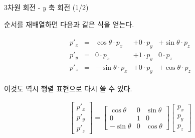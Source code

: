 \begin{frame}{3차원 회전 - $y$ 축 회전 (1/2)}

순서를 재배열하면 다음과 같은 식을 얻는다.

\begin{eqnarray}
\begin{array}{clrrr}
p'_x  & = & \cos \theta \cdot p_x &+ 0 \cdot p_y &+ \sin \theta \cdot p_z  \\
p'_y  & =  &0 \cdot p_x &+ 1 \cdot p_y & 0 \cdot p_z \\
p'_z  & = &-\sin \theta \cdot p_x &+ 0 \cdot p_y  & + \cos \theta \cdot p_z 
\end{array} \nonumber
\end{eqnarray}

이것도 역시 행렬 표현으로 다시 쓸 수 있다.

\begin{eqnarray}
\left [ \begin{array}{c} p'_x \\ p'_y \\ p'_z  \end{array} \right ] 
=
\left [ \begin{array}{rrr}
\cos \theta & 0 &  \sin \theta  \\
0 & 1 & 0 \\
- \sin \theta & 0 & \cos \theta
\end{array} \right ]
\left [ \begin{array}{c} p_x \\ p_y \\ p_z \end{array} \right ]  \nonumber
\end{eqnarray}


\end{frame}

